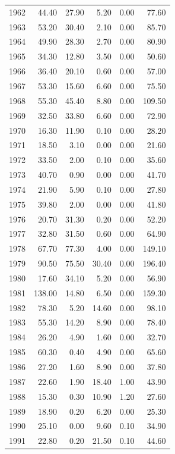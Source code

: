 \documentclass[12pt,]{article}
\begin{document}
\begin{longtable}{rrrrrr}
  1962 & 44.40 & 27.90 & 5.20 & 0.00 & 77.60 \\ 
  1963 & 53.20 & 30.40 & 2.10 & 0.00 & 85.70 \\ 
  1964 & 49.90 & 28.30 & 2.70 & 0.00 & 80.90 \\ 
  1965 & 34.30 & 12.80 & 3.50 & 0.00 & 50.60 \\ 
  1966 & 36.40 & 20.10 & 0.60 & 0.00 & 57.00 \\ 
  1967 & 53.30 & 15.60 & 6.60 & 0.00 & 75.50 \\ 
  1968 & 55.30 & 45.40 & 8.80 & 0.00 & 109.50 \\ 
  1969 & 32.50 & 33.80 & 6.60 & 0.00 & 72.90 \\ 
  1970 & 16.30 & 11.90 & 0.10 & 0.00 & 28.20 \\ 
  1971 & 18.50 & 3.10 & 0.00 & 0.00 & 21.60 \\ 
  1972 & 33.50 & 2.00 & 0.10 & 0.00 & 35.60 \\ 
  1973 & 40.70 & 0.90 & 0.00 & 0.00 & 41.70 \\ 
  1974 & 21.90 & 5.90 & 0.10 & 0.00 & 27.80 \\ 
  1975 & 39.80 & 2.00 & 0.00 & 0.00 & 41.80 \\ 
  1976 & 20.70 & 31.30 & 0.20 & 0.00 & 52.20 \\ 
  1977 & 32.80 & 31.50 & 0.60 & 0.00 & 64.90 \\ 
  1978 & 67.70 & 77.30 & 4.00 & 0.00 & 149.10 \\ 
  1979 & 90.50 & 75.50 & 30.40 & 0.00 & 196.40 \\ 
  1980 & 17.60 & 34.10 & 5.20 & 0.00 & 56.90 \\ 
  1981 & 138.00 & 14.80 & 6.50 & 0.00 & 159.30 \\ 
  1982 & 78.30 & 5.20 & 14.60 & 0.00 & 98.10 \\ 
  1983 & 55.30 & 14.20 & 8.90 & 0.00 & 78.40 \\ 
  1984 & 26.20 & 4.90 & 1.60 & 0.00 & 32.70 \\ 
  1985 & 60.30 & 0.40 & 4.90 & 0.00 & 65.60 \\ 
  1986 & 27.20 & 1.60 & 8.90 & 0.00 & 37.80 \\ 
  1987 & 22.60 & 1.90 & 18.40 & 1.00 & 43.90 \\ 
  1988 & 15.30 & 0.30 & 10.90 & 1.20 & 27.60 \\ 
  1989 & 18.90 & 0.20 & 6.20 & 0.00 & 25.30 \\ 
  1990 & 25.10 & 0.00 & 9.60 & 0.10 & 34.90 \\ 
  1991 & 22.80 & 0.20 & 21.50 & 0.10 & 44.60 \\ 

\end{longtable}
\end{document}
